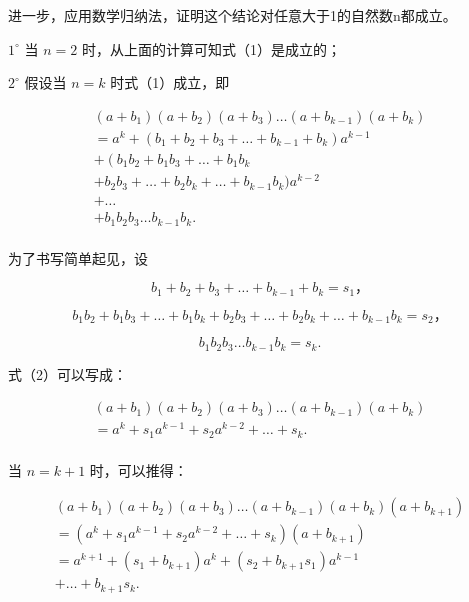 进一步，应用数学归纳法，证明这个结论对任意大于1的自然数n都成立。

\(1^{\circ}\) 当 \(n = 2\) 时，从上面的计算可知式（1）是成立的；

\(2^{\circ}\) 假设当 \(n = k\) 时式（1）成立，即

\[
\begin{array}{l} \left(a + b _ {1}\right) \left(a + b _ {2}\right) \left(a + b _ {3}\right) \dots \left(a + b _ {k - 1}\right) \left(a + b _ {k}\right) \\ = a ^ {k} + \left(b _ {1} + b _ {2} + b _ {3} + \dots + b _ {k - 1} + b _ {k}\right) a ^ {k - 1} \\ + \left(b _ {1} b _ {2} + b _ {1} b _ {3} + \dots + b _ {1} b _ {k} \right. \\ + b _ {2} b _ {3} + \dots + b _ {2} b _ {k} + \dots + b _ {k - 1} b _ {k}) a ^ {k - 2} \\ + \dots \\ + b _ {1} b _ {2} b _ {3} \dots b _ {k - 1} b _ {k}. \tag {2} \\ \end{array}
\]

为了书写简单起见，设

\[
b _ {1} + b _ {2} + b _ {3} + \dots + b _ {k - 1} + b _ {k} = s _ {1}\text{，}
\]

\[
b _ {1} b _ {2} + b _ {1} b _ {3} + \dots + b _ {1} b _ {k} + b _ {2} b _ {3} + \dots + b _ {2} b _ {k} + \dots + b _ {k - 1} b _ {k} = s _ {2}\text{，}
\]

\[
b _ {1} b _ {2} b _ {3} \dots b _ {k - 1} b _ {k} = s _ {k}.
\]

式（2）可以写成：

\[
\begin{array}{l} (a + b _ {1}) (a + b _ {2}) (a + b _ {3}) \dots (a + b _ {k - 1}) (a + b _ {k}) \\ = a ^ {k} + s _ {1} a ^ {k - 1} + s _ {2} a ^ {k - 2} + \dots + s _ {k}. \tag {3} \\ \end{array}
\]

当 \(n=k+1\) 时，可以推得：

\[
\begin{array}{l} (a + b _ {1}) (a + b _ {2}) (a + b _ {3}) \dots (a + b _ {k - 1}) (a + b _ {k}) (a + b _ {k + 1}) \\ = \left(a ^ {k} + s _ {1} a ^ {k - 1} + s _ {2} a ^ {k - 2} + \dots + s _ {k}\right) \left(a + b _ {k + 1}\right) \\ = a ^ {k + 1} + \left(s _ {1} + b _ {k + 1}\right) a ^ {k} + \left(s _ {2} + b _ {k + 1} s _ {1}\right) a ^ {k - 1} \\ + \dots + b _ {k + 1} s _ {k}. \tag {4} \\ \end{array}
\]

